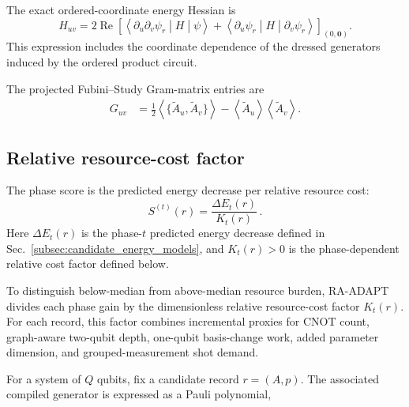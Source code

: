 \documentclass[
  reprint,
  amsmath,
  amssymb,
  aps,
  pra,
  nofootinbib,
  superscriptaddress,
  floatfix
]{revtex4-2}
\begin{document}
The exact ordered-coordinate energy Hessian is
\begin{equation}
H_{uv}
=
2\operatorname{Re}\!\left[
\left\langle
\partial_u\partial_v\psi_r
\middle|H\middle|\psi
\right\rangle
+
\left\langle
\partial_u\psi_r
\middle|H\middle|
\partial_v\psi_r
\right\rangle
\right]_{(0,\mathbf0)} .
\label{eq:joint_hessian_observable}
\end{equation}
This expression includes the coordinate dependence of the dressed generators
induced by the ordered product circuit.

The projected Fubini--Study Gram-matrix entries are
\begin{equation}
\begin{aligned}
G_{uv}
&=\frac12\left\langle
\{\widetilde A_u,\widetilde A_v\}
\right\rangle
-\left\langle\widetilde A_u\right\rangle
 \left\langle\widetilde A_v\right\rangle .
\end{aligned}
\label{eq:joint_gram_observable}
\end{equation}

\subsection{Relative resource-cost factor}
\label{subsec:cost_weighted_record_ranking}
%
The phase score is the predicted energy decrease per relative resource cost:
\begin{equation}
S^{(t)}(r)
=
\frac{\Delta E_t(r)}{K_t(r)}\,.
\label{eq:master_phase_score}
\end{equation}
Here \(\Delta E_t(r)\) is the phase-\(t\) predicted energy decrease defined in
Sec.~\ref{subsec:candidate_energy_models}, and \(K_t(r)>0\) is the
phase-dependent relative cost factor defined below.

To distinguish below-median from above-median resource burden, \textsc{RA-ADAPT}
divides each phase gain by the dimensionless relative resource-cost factor
\(K_t(r)\). For each record, this factor combines
incremental proxies for CNOT count, graph-aware two-qubit depth,
one-qubit basis-change work, added parameter dimension, and grouped-measurement
shot demand.

For a system of \(Q\) qubits, fix a candidate record \(r=(A,p)\). The associated compiled generator is expressed as a Pauli polynomial,
\end{document}

